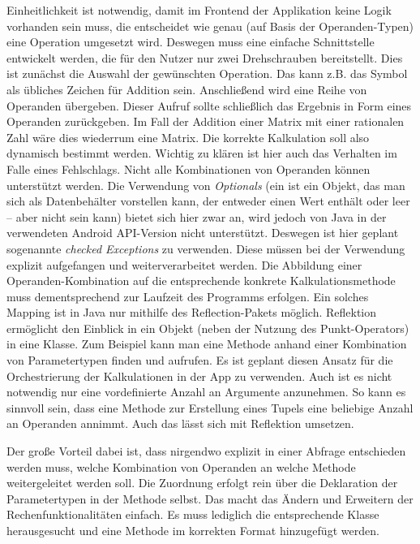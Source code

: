 Einheitlichkeit ist notwendig, damit im Frontend der Applikation keine Logik vorhanden sein muss, die entscheidet wie genau (auf Basis der Operanden-Typen) eine Operation umgesetzt wird. Deswegen muss eine einfache Schnittstelle entwickelt werden, die für den Nutzer nur zwei Drehschrauben bereitstellt. Dies ist zunächst die Auswahl der gewünschten Operation. Das kann z.B. das Symbol \code{+} als übliches Zeichen für Addition sein. Anschließend wird eine Reihe von Operanden übergeben. Dieser Aufruf sollte schließlich das Ergebnis in Form eines Operanden zurückgeben. Im Fall der Addition einer Matrix mit einer rationalen Zahl wäre dies wiederrum eine Matrix. Die korrekte Kalkulation soll also dynamisch bestimmt werden. Wichtig zu klären ist hier auch das Verhalten im Falle eines Fehlschlags. Nicht alle Kombinationen von Operanden können unterstützt werden. Die Verwendung von \textit{Optionals} (ein  ist ein Objekt, das man sich als Datenbehälter vorstellen kann, der entweder einen Wert enthält oder leer – aber nicht  sein kann) bietet sich hier zwar an, wird jedoch von Java in der verwendeten Android API-Version nicht unterstützt. Deswegen ist hier geplant sogenannte \textit{checked Exceptions} zu verwenden. Diese müssen bei der Verwendung explizit aufgefangen und weiterverarbeitet werden. Die Abbildung einer Operanden-Kombination auf die entsprechende konkrete Kalkulationsmethode muss dementsprechend zur Laufzeit des Programms erfolgen. Ein solches Mapping ist in Java nur mithilfe des Reflection-Pakets möglich. Reflektion ermöglicht den Einblick in ein Objekt (neben der Nutzung des Punkt-Operators) in eine Klasse. Zum Beispiel kann man eine Methode anhand einer Kombination von Parametertypen finden und aufrufen. Es ist geplant diesen Ansatz für die Orchestrierung der Kalkulationen in der App zu verwenden. Auch ist es nicht notwendig nur eine vordefinierte Anzahl an Argumente anzunehmen. So kann es sinnvoll sein, dass eine Methode zur Erstellung eines Tupels eine beliebige Anzahl an Operanden annimmt. Auch das lässt sich mit Reflektion umsetzen.

Der große Vorteil dabei ist, dass nirgendwo explizit in einer Abfrage entschieden werden muss, welche Kombination von Operanden an welche Methode weitergeleitet werden soll. Die Zuordnung erfolgt rein über die Deklaration der Parametertypen in der Methode selbst. Das macht das Ändern und Erweitern der Rechenfunktionalitäten einfach. Es muss lediglich die entsprechende Klasse herausgesucht und eine Methode im korrekten Format hinzugefügt werden. 

